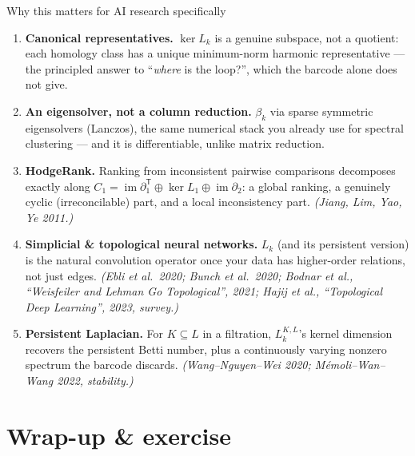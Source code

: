 \documentclass[10pt,aspectratio=169]{beamer}
\newcommand{\im}{\operatorname{im}}
\begin{document}
    \begin{frame}[shrink=12]{Why this matters for AI research specifically}
        \small
        \begin{enumerate}
            \item \textbf{Canonical representatives.} $\ker L_k$ is a genuine subspace, not a
            quotient: each homology class has a unique minimum-norm harmonic
            representative --- the principled answer to ``\emph{where} is the loop?'',
            which the barcode alone does not give.
            \item \textbf{An eigensolver, not a column reduction.} $\beta_k$ via sparse
            symmetric eigensolvers (Lanczos), the same numerical stack you already use
            for spectral clustering --- and it is differentiable, unlike matrix reduction.
            \item \textbf{HodgeRank.} Ranking from inconsistent pairwise comparisons decomposes
            exactly along $C_1=\im\partial_1^{\mathsf T}\oplus\ker L_1\oplus\im\partial_2$:
            a global ranking, a genuinely cyclic (irreconcilable) part, and a local
            inconsistency part. \emph{(Jiang, Lim, Yao, Ye 2011.)}
            \item \textbf{Simplicial \& topological neural networks.} $L_k$ (and its persistent
            version) is the natural convolution operator once your data has higher-order
            relations, not just edges. \emph{(Ebli et al.\ 2020; Bunch et al.\ 2020;
            Bodnar et al., ``Weisfeiler and Lehman Go Topological'', 2021; Hajij et al.,
                ``Topological Deep Learning'', 2023, survey.)}
            \item \textbf{Persistent Laplacian.} For $K\subseteq L$ in a filtration,
            $L_k^{K,L}$'s kernel dimension recovers the persistent Betti number, plus a
            continuously varying nonzero spectrum the barcode discards.
            \emph{(Wang--Nguyen--Wei 2020; M\'emoli--Wan--Wang 2022, stability.)}
        \end{enumerate}
    \end{frame}

    \section{Wrap-up \& exercise}
\end{document}
